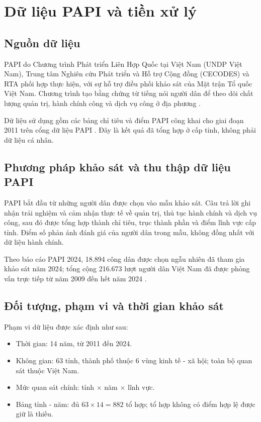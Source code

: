 \section{Dữ liệu PAPI và tiền xử lý}
\label{sec:data-preprocessing}

\subsection{Nguồn dữ liệu}

PAPI do Chương trình Phát triển Liên Hợp Quốc tại Việt Nam (UNDP Việt Nam), Trung tâm Nghiên cứu Phát triển và Hỗ trợ Cộng đồng (CECODES) và RTA phối hợp thực hiện, với sự hỗ trợ điều phối khảo sát của Mặt trận Tổ quốc Việt Nam. Chương trình tạo bằng chứng từ tiếng nói người dân để theo dõi chất lượng quản trị, hành chính công và dịch vụ công ở địa phương \cite{undpPapiProject,undpPapi2024}.

Dữ liệu sử dụng gồm các bảng chỉ tiêu và điểm PAPI công khai cho giai đoạn 2011 trên cổng dữ liệu PAPI \cite{papiDataPortal}. Đây là kết quả đã tổng hợp ở cấp tỉnh, không phải dữ liệu cá nhân.

\subsection{Phương pháp khảo sát và thu thập dữ liệu PAPI}

PAPI bắt đầu từ những người dân được chọn vào mẫu khảo sát. Câu trả lời ghi nhận trải nghiệm và cảm nhận thực tế về quản trị, thủ tục hành chính và dịch vụ công, sau đó được tổng hợp thành chỉ tiêu, trục thành phần và điểm lĩnh vực cấp tỉnh. Điểm số phản ánh đánh giá của người dân trong mẫu, không đồng nhất với dữ liệu hành chính.

Theo báo cáo PAPI 2024, 18.894 công dân được chọn ngẫu nhiên đã tham gia khảo sát năm 2024; tổng cộng 216.673 lượt người dân Việt Nam đã được phỏng vấn trực tiếp từ năm 2009 đến hết năm 2024 \cite{undpPapi2024}.

\subsection{Đối tượng, phạm vi và thời gian khảo sát}

Phạm vi dữ liệu được xác định như sau:

\begin{itemize}
    \setlength{\itemsep}{0.2em}
    \setlength{\parskip}{0pt}
    \item Thời gian: 14 năm, từ 2011 đến 2024.
    \item Không gian: 63 tỉnh, thành phố thuộc 6 vùng kinh tế - xã hội; toàn bộ quan sát thuộc Việt Nam.
    \item Mức quan sát chính: tỉnh $\times$ năm $\times$ lĩnh vực.
    \item Bảng tỉnh - năm: đủ $63 \times 14 = 882$ tổ hợp; tổ hợp không có điểm hợp lệ được giữ là thiếu.
\end{itemize}

